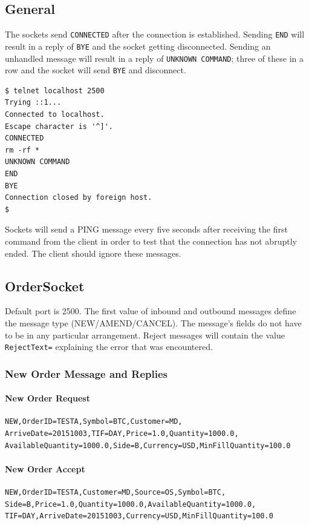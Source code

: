 \documentclass[Letter]{article}
\begin{document}
\subsection{General}

The sockets send \texttt{CONNECTED} after the connection is established.
Sending \texttt{END} will result in a reply of \texttt{BYE} and the
socket getting disconnected.  Sending an unhandled message will result
in a reply of \texttt{UNKNOWN COMMAND}; three of these in a row and the
socket will send \texttt{BYE} and disconnect.

\begin{verbatim}
$ telnet localhost 2500
Trying ::1...
Connected to localhost.
Escape character is '^]'.
CONNECTED
rm -rf *
UNKNOWN COMMAND
END
BYE
Connection closed by foreign host.
$
\end{verbatim}

Sockets will send a PING message every five seconds after receiving
the first command from the client in order to test that the connection
has not abruptly ended.  The client should ignore these messages.

\subsection{OrderSocket}

Default port is 2500.  The first value of inbound and outbound
messages define the message type (NEW/AMEND/CANCEL).  The message's
fields do not have to be in any particular arrangement.  Reject messages
will contain the value \texttt{RejectText=} explaining the error
that was encountered.

\subsubsection{New Order Message and Replies}

\paragraph{New Order Request}
\begin{verbatim}
NEW,OrderID=TESTA,Symbol=BTC,Customer=MD,
ArriveDate=20151003,TIF=DAY,Price=1.0,Quantity=1000.0,
AvailableQuantity=1000.0,Side=B,Currency=USD,MinFillQuantity=100.0
\end{verbatim}

\paragraph{New Order Accept}
\begin{verbatim}
NEW,OrderID=TESTA,Customer=MD,Source=OS,Symbol=BTC,
Side=B,Price=1.0,Quantity=1000.0,AvailableQuantity=1000.0,
TIF=DAY,ArriveDate=20151003,Currency=USD,MinFillQuantity=100.0
\end{verbatim}
\end{document}
